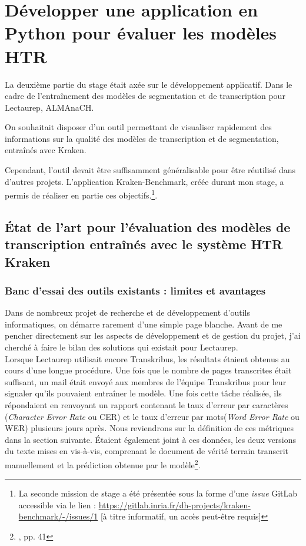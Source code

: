 \part{Développer une application en Python pour évaluer les modèles HTR}\label{partie_3}

La deuxième partie du stage était axée sur le développement applicatif. Dans le cadre de l'entraînement des modèles de segmentation et de transcription pour Lectaurep, ALMAnaCH. 

On souhaitait disposer d'un outil permettant de visualiser rapidement des informations sur la qualité des modèles de transcription et de segmentation, entraînés avec Kraken. 

Cependant, l'outil devait être suffisamment généralisable pour être réutilisé dans d'autres projets. L'application Kraken-Benchmark, créée durant mon stage, a permis de réaliser en partie ces objectifs.\footnote{La seconde mission de stage a été présentée sous la forme d'une \textit{issue} GitLab accessible via le lien : \url{https://gitlab.inria.fr/dh-projects/kraken-benchmark/-/issues/1} [à titre informatif, un accès peut-être requis]}.\\ 
\clearpage
\thispagestyle{empty}
\chapter{État de l'art pour l'évaluation des modèles de transcription entraînés avec le système HTR Kraken}

\section{Banc d'essai des outils existants : limites et avantages}

Dans de nombreux projet de recherche et de développement d'outils informatiques, on démarre rarement d'une simple page blanche. Avant de me pencher directement sur les aspects de développement et de gestion du projet, j'ai cherché à faire le bilan des solutions qui existait pour Lectaurep.\\

Lorsque Lectaurep utilisait encore Transkribus, les résultats étaient obtenus au cours d'une longue procédure. Une fois que le nombre de pages transcrites était suffisant, un mail était envoyé aux membres de l'équipe Transkribus pour leur signaler qu'ils pouvaient entraîner le modèle. Une fois cette tâche réalisée, ils répondaient en renvoyant un rapport contenant le taux d'erreur par caractères (\textit{Character Error Rate} ou CER) et le taux d'erreur par mots(\textit{Word Error Rate} ou WER) plusieurs jours après. Nous reviendrons sur la définition de ces métriques dans la section suivante. Étaient également joint à ces données, les deux versions du texte mises en vis-à-vis, comprenant le document de vérité terrain transcrit manuellement et la prédiction obtenue par le modèle\footnote{\cite{bonhomme_defis_2018}, pp. 41}.

